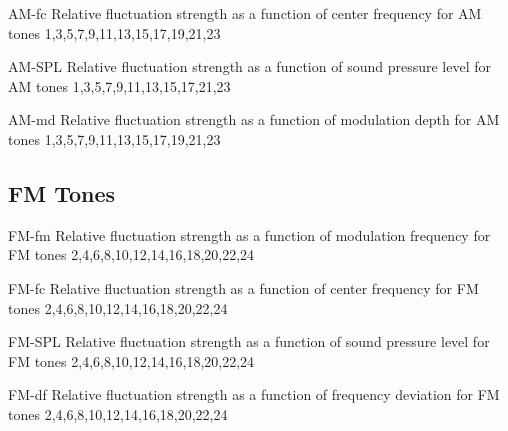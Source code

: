 \documentclass{article}
\begin{document}
  {AM-fc}
  {Relative fluctuation strength as a function of center frequency for AM
  tones}
  {1,3,5,7,9,11,13,15,17,19,21,23}

\clearpage

  {AM-SPL}
  {Relative fluctuation strength as a function of sound pressure level for AM
  tones}
  {1,3,5,7,9,11,13,15,17,21,23}

\clearpage

  {AM-md}
  {Relative fluctuation strength as a function of modulation depth for AM
  tones}
  {1,3,5,7,9,11,13,15,17,19,21,23}

\clearpage


\subsection{FM Tones} %
\label{subsec:individual_results_fm_tones}

  {FM-fm}
  {Relative fluctuation strength as a function of modulation frequency for FM
  tones}
  {2,4,6,8,10,12,14,16,18,20,22,24}

\clearpage

  {FM-fc}
  {Relative fluctuation strength as a function of center frequency for FM
  tones}
  {2,4,6,8,10,12,14,16,18,20,22,24}

\clearpage

  {FM-SPL}
  {Relative fluctuation strength as a function of sound pressure level for FM
  tones}
  {2,4,6,8,10,12,14,16,18,20,22,24}

\clearpage

  {FM-df}
  {Relative fluctuation strength as a function of frequency deviation for FM
  tones}
  {2,4,6,8,10,12,14,16,18,20,22,24}

\clearpage


\end{document}
